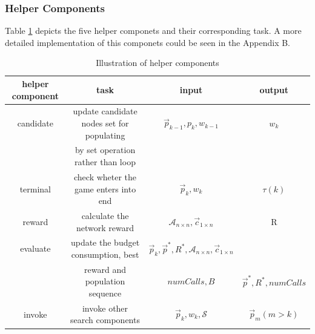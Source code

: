\documentclass{article}
\begin{document}
\subsubsection{Helper Components}
Table \ref{tab:helper_components} depicts the five helper componets and their corresponding task. A more detailed implementation of this componets could be seen in the Appendix B.

\begin{table}[htbp]
  \centering
  \caption{Illustration of helper components}
    \begin{tabular}{cccc}
    \toprule
    helper component &  task  & input & output \\
    \midrule
    candidate & update candidate nodes set for populating & $\vec p_{k-1}, p_{k}, w_{k-1}$ & $w_{k}$\\
     & by set operation rather than loop& & \\
    terminal & check wheter the game enters into end & $\vec p_{k}, w_{k}$ & $\tau(k)$ \\
    reward & calculate the network reward & $\mathcal{A}_{n \times n}, \vec c_{1 \times n}$ & R\\
    evaluate & update the budget consumption, best & $\vec p_{k}, \vec p^{*}, R^{*}, \mathcal{A}_{n \times n}, \vec c_{1 \times n}$ & \\
      & reward and population sequence & $numCalls, B$ & $\vec p^{*}, R^{*}, numCalls$ \\
    invoke & invoke other search components & $\vec p_{k}, w_{k}, \mathcal{S}$ & $\vec p_{m} (m > k)$ \\
    \bottomrule
    \end{tabular}%
  \label{tab:helper_components}%
\end{table}%
\end{document}
